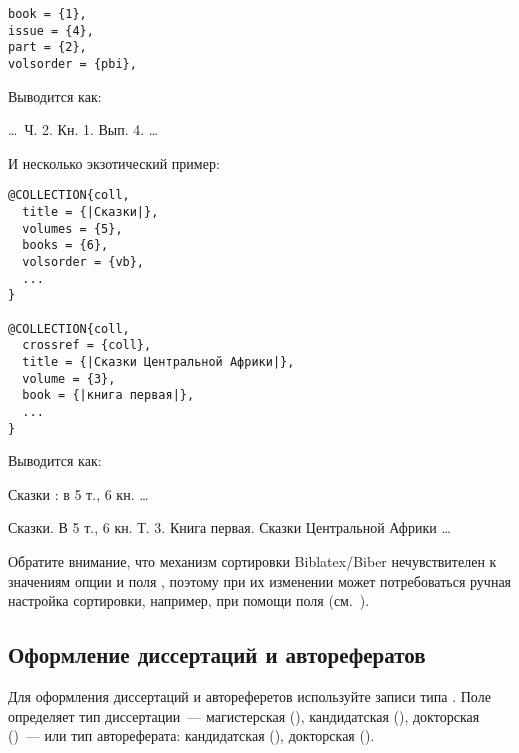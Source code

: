 \documentclass[10pt,a4paper,headings=small,numbers=enddot,english,russian]{ltxdockit}
\newcommand*{\biber}{Biber\xspace}
\newcommand*{\biblatex}{Biblatex\xspace}
\newenvironment{bibexample}{\begin{list}
     {}
     {\setlength{\leftmargin}{\parindent}%
      \setlength{\itemindent}{-\leftmargin}%
      \setlength{\parsep}{0pt}}}
  {\end{list}}
\begin{document}
\bigskip

\begin{multicols}{2}
\begin{lstlisting}[style=bibtex,escapechar=|]
book = {1},
issue = {4},
part = {2},
volsorder = {pbi},
\end{lstlisting}
\columnbreak
Выводится как:%
\begin{bibexample}
\item \ldots\ Ч. 2. Кн. 1. Вып. 4. \ldots
\end{bibexample}
\columnbreak
\end{multicols}

\bigskip
И несколько экзотический пример:
\bigskip

\begin{multicols}{2}
\begin{lstlisting}[style=bibtex,escapechar=|]
@COLLECTION{coll,
  title = {|Сказки|},
  volumes = {5},
  books = {6},
  volsorder = {vb},
  ...
}

@COLLECTION{coll,
  crossref = {coll},
  title = {|Сказки Центральной Африки|},
  volume = {3},
  book = {|книга первая|},
  ...
}
\end{lstlisting}
\columnbreak
Выводится как:
\begin{bibexample}
\item Сказки : в 5 т., 6 кн. \ldots
\item Сказки. В 5 т., 6 кн. Т. 3. Книга первая. Сказки Центральной Африки \ldots
\end{bibexample}
\end{multicols}

\bigskip
Обратите внимание, что механизм сортировки \biblatex\unspace\slash\biber
нечувствителен к значениям опции %
и поля , поэтому при их изменении может потребоваться ручная настройка
сортировки, например, при помощи поля  (см.~).

\subsection{Оформление диссертаций и авторефератов}
\label{sec:dissers}

Для оформления диссертаций и автореферетов
используйте записи типа . Поле 
определяет тип диссертации~--- магистерская (), кандидатская (),
докторская ()~--- или тип автореферата: кандидатская (),
докторская ().
\end{document}
